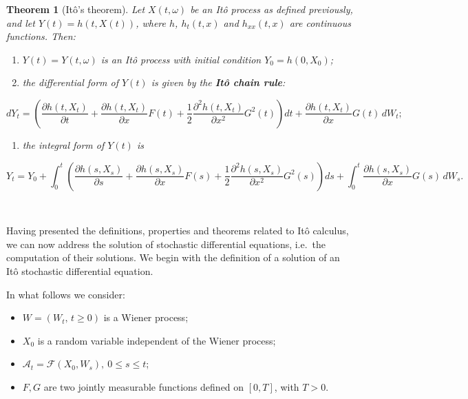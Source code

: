 \documentclass[
  11pt,
  a4paper,
]{book}
\providecommand{\tightlist}{%
  \setlength{\itemsep}{0pt}\setlength{\parskip}{0pt}}
\newtheorem{theorem}{Theorem}[chapter]
\theoremstyle{definition}
\theoremstyle{definition}
\theoremstyle{definition}
\theoremstyle{definition}
\theoremstyle{remark}
\begin{document}
\begin{theorem}[Itô's theorem]
Let \(X(t,\omega)\) be an Itô process as defined previously, and let \(Y(t) = h(t,X(t))\), where \(h\), \(h_{t}(t,x)\) and \(h_{xx}(t,x)\) are continuous functions. Then:

\begin{enumerate}
\def\labelenumi{(\roman{enumi})}
\item
  \(Y(t) = Y(t,\omega)\) is an Itô process with initial condition \(Y_0 = h(0, X_0)\);
\item
  the differential form of \(Y(t)\) is given by the \textbf{Itô chain rule}:
\end{enumerate}

\[
dY_t = \left(\frac{\partial h(t,X_t)}{\partial t} + \frac{\partial h(t,X_t)}{\partial x} F(t) + \frac{1}{2} \frac{\partial^2 h(t,X_t)}{\partial x^2} G^2(t)\right) dt + \frac{\partial h(t,X_t)}{\partial x} G(t) \, dW_t;
\]

\begin{enumerate}
\def\labelenumi{(\roman{enumi})}
\setcounter{enumi}{2}
\tightlist
\item
  the integral form of \(Y(t)\) is
\end{enumerate}

\[
Y_t = Y_0 + \int_{0}^{t} \left( \frac{\partial h(s,X_s)}{\partial s} + \frac{\partial h(s,X_s)}{\partial x} F(s) + \frac{1}{2} \frac{\partial^2 h(s,X_s)}{\partial x^2} G^2(s) \right) ds + \int_{0}^{t} \frac{\partial h(s,X_s)}{\partial x} G(s) \, dW_s.
\]
\end{theorem}

\(\,\)

Having presented the definitions, properties and theorems related to Itô calculus, we can now address the solution of stochastic differential equations, i.e.~the computation of their solutions. We begin with the definition of a solution of an Itô stochastic differential equation.

In what follows we consider:

\begin{itemize}
\item
  \(W = (W_t,\, t \ge 0)\) is a Wiener process;
\item
  \(X_0\) is a random variable independent of the Wiener process;
\item
  \(\mathcal{A}_t = \mathcal{F}(X_0, W_s),\ 0 \le s \le t\);
\item
  \(F, G\) are two jointly measurable functions defined on \([0,T]\), with \(T>0\).
\end{itemize}
\end{document}
